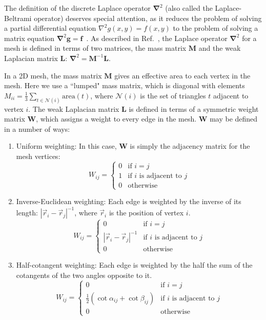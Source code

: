 \documentclass[final,3p,times]{elsarticle}
\newcounter{bla}
\begin{document}
The definition of the discrete Laplace operator $\mathbf{\nabla}^2$ (also called the Laplace-Beltrami operator) deserves special attention, as it reduces the problem of solving a partial differential equation $\nabla^2g(x,y)=f(x,y)$ to the problem of solving a matrix equation
$\mathbf{\nabla}^2\mathbf{g}=\mathbf{f}$~\cite{Reuter_Biasotti_Giorgi_Patane_Spagnuolo_2009}. As described in Ref.~\cite{Crane_Vouga_2014}, the Laplace operator $\mathbf{\nabla}^2$ for a mesh is defined in terms of two matrices, the mass matrix $\mathbf{M}$ and the
weak Laplacian matrix $\mathbf{L}$: $\mathbf{\nabla}^2 = \mathbf{M}^{-1}\mathbf{L}$.


In a 2D mesh, the mass matrix $\mathbf{M}$ gives an effective area to each vertex in the mesh. Here we use a ``lumped" mass matrix, which is diagonal with elements $M_{ii} = \frac{1}{3}\sum_{t\in\mathcal{N}(i)}\mathrm{area}(t)$,
where $\mathcal{N}(i)$ is the set of triangles $t$ adjacent to vertex $i$. The weak Laplacian matrix $\mathbf{L}$ is defined in terms of a symmetric weight matrix $\mathbf{W}$, which assigns a weight to every edge in the mesh. $\mathbf{W}$ may be defined in a number of ways:

\begin{enumerate}
    \item{
        Uniform weighting: In this case, $\mathbf{W}$ is simply the adjacency matrix for the mesh vertices:
        $$
            W_{ij} =
            \begin{cases}
                0&\text{if }i=j\\
                1&\text{if }i\text{ is adjacent to }j\\
                0&\text{otherwise}
            \end{cases}
        $$
    }
    \item{
        Inverse-Euclidean weighting: Each edge is weighted by the inverse of its length: $|\vec{r}_i-\vec{r}_j|^{-1}$, where $\vec{r}_i$ is the position of vertex $i$.
        $$
            W_{ij} =
            \begin{cases}
                0&\text{if }i=j\\
                |\vec{r}_i-\vec{r}_j|^{-1}&\text{if }i\text{ is adjacent to }j\\
                0&\text{otherwise}
            \end{cases}
        $$
    }
    \item{
        Half-cotangent weighting: Each edge is weighted by the half the sum of the cotangents of the two angles opposite to it.
        $$
            W_{ij} =
            \begin{cases}
                0&\text{if }i=j\\
                \frac{1}{2}\left(\cot\alpha_{ij}+\cot\beta_{ij}\right)&\text{if }i\text{ is adjacent to }j\\
                0&\text{otherwise}
            \end{cases}
        $$
    }
\end{enumerate}
\end{document}
